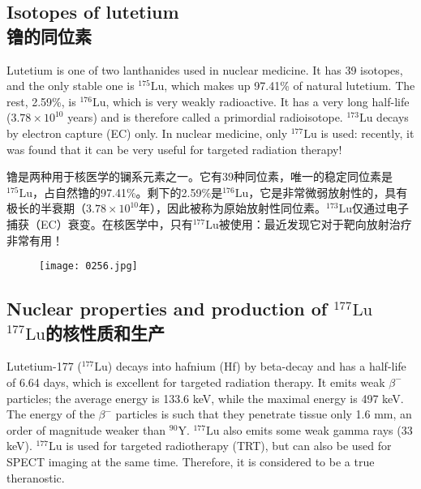 \documentclass[dvipsnames, svgnames,a4paper,11pt]{article}
\begin{document}
\subsection{Isotopes of lutetium\\ 镥的同位素}  
Lutetium is one of two lanthanides used in nuclear medicine. It has 39 isotopes, and the only stable one is \(\mathrm{^{175}Lu}\), which makes up 97.41\% of natural lutetium. The rest, 2.59\%, is \(\mathrm{^{176}Lu}\), which is very weakly radioactive. It has a very long half-life (\(3.78 \times 10^{10}\) years) and is therefore called a primordial radioisotope. \(\mathrm{^{173}Lu}\) decays by electron capture (EC) only. In nuclear medicine, only \(\mathrm{^{177}Lu}\) is used: recently, it was found that it can be very useful for targeted radiation therapy!

镥是两种用于核医学的镧系元素之一。它有39种同位素，唯一的稳定同位素是\(\mathrm{^{175}Lu}\)，占自然镥的97.41\%。剩下的2.59\%是\(\mathrm{^{176}Lu}\)，它是非常微弱放射性的，具有极长的半衰期（\(3.78 \times 10^{10}\)年），因此被称为原始放射性同位素。\(\mathrm{^{173}Lu}\)仅通过电子捕获（EC）衰变。在核医学中，只有\(\mathrm{^{177}Lu}\)被使用：最近发现它对于靶向放射治疗非常有用！

\begin{figure}[h]
	\centering
    \texttt{[image: 0256.jpg]}  
     \label{fig344}
\end{figure}


\subsection{Nuclear properties and production of \(\mathrm{^{177}Lu}\)\\ \(\mathrm{^{177}Lu}\)的核性质和生产}  
Lutetium-177 (\(\mathrm{^{177}Lu}\)) decays into hafnium (Hf) by beta-decay and has a half-life of 6.64 days, which is excellent for targeted radiation therapy. It emits weak \(\beta^-\) particles; the average energy is 133.6 keV, while the maximal energy is 497 keV. The energy of the \(\beta^-\) particles is such that they penetrate tissue only 1.6 mm, an order of magnitude weaker than \(\mathrm{^{90}Y}\). \(\mathrm{^{177}Lu}\) also emits some weak gamma rays (33 keV). \(\mathrm{^{177}Lu}\) is used for targeted radiotherapy (TRT), but can also be used for SPECT imaging at the same time. Therefore, it is considered to be a true theranostic.  
\end{document}

